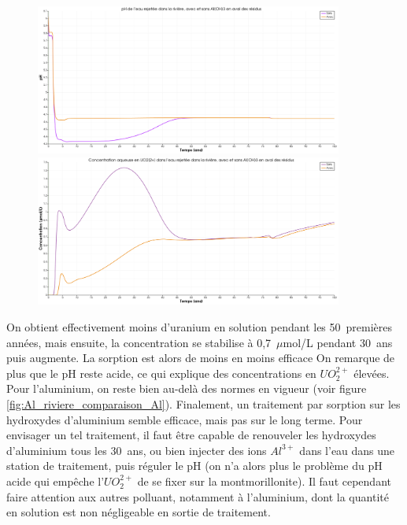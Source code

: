 \documentclass{article}
\begin{document}
\begin{figure}[H]
    \centering
    \begin{minipage}{0.5\textwidth}
        \centering
        \includegraphics[width=0.9\textwidth]{III_B_2_22.png} 
        \caption{}
        \label{fig:pH_riviere_comparaison_Al}
    \end{minipage}\hfill
    \begin{minipage}{0.5\textwidth}
        \centering
        \includegraphics[width=0.9\textwidth]{III_B_2_23.png} 
        \caption{}
        \label{fig:UO2_riviere_comparaison_Al}
    \end{minipage}
\end{figure}



On obtient effectivement moins d’uranium en solution pendant les 50~premières années, mais ensuite, la concentration se stabilise à 0,7~$\mu$mol/L pendant 30~ans puis augmente. La sorption est alors de moins en moins efficace On remarque de plus que le pH reste acide, ce qui explique des concentrations en $UO_2^{2+}$ élevées. Pour l’aluminium, on reste bien au-delà des normes en vigueur (voir figure \ref{fig:Al_riviere_comparaison_Al}).
Finalement, un traitement par sorption sur les hydroxydes d’aluminium semble efficace, mais pas sur le long terme. Pour envisager un tel traitement, il faut être capable de renouveler les hydroxydes d’aluminium tous les 30~ans, ou bien injecter des ions $Al^{3+}$ dans l’eau dans une station de traitement, puis réguler le pH (on n’a alors plus le problème du pH acide qui empêche l’$UO_2^{2+}$ de se fixer sur la montmorillonite). Il faut cependant faire attention aux autres polluant, notamment à l’aluminium, dont la quantité en solution est non négligeable en sortie de traitement.
\end{document}
